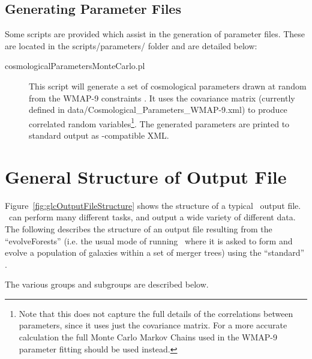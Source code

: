 \subsection{Generating Parameter Files}

Some scripts are provided which assist in the generation of parameter files. These are located in the {\normalfont \ttfamily scripts/parameters/} folder and are detailed below:
\begin{description}
\item [{\normalfont \ttfamily cosmologicalParametersMonteCarlo.pl}] This script will generate a set of cosmological parameters drawn at random from the WMAP-9 constraints \citep{hinshaw_nine-year_2012}. It uses the covariance matrix (currently defined in {\normalfont \ttfamily data/Cosmological\_Parameters\_WMAP-9.xml}) to produce correlated random variables\footnote{Note that this does not capture the full details of the correlations between parameters, since it uses just the covariance matrix. For a more accurate calculation the full Monte Carlo Markov Chains used in the WMAP-9 parameter fitting should be used instead.}. The generated parameters are printed to standard output as \glc-compatible XML.
\end{description}

\section{General Structure of Output File}\label{sec:outputFile}

Figure~\ref{fig:glcOutputFileStructure} shows the structure of a typical \glc\ output file. \glc\ can perform many different tasks, and output a wide variety of different data. The following describes the structure of an output file resulting from the ``{\normalfont \ttfamily evolveForests}''  (i.e. the usual mode of running \glc\ where it is asked to form and evolve a population of galaxies within a set of merger trees) using the ``{\normalfont \ttfamily standard}'' .

The various groups and subgroups are described below.

